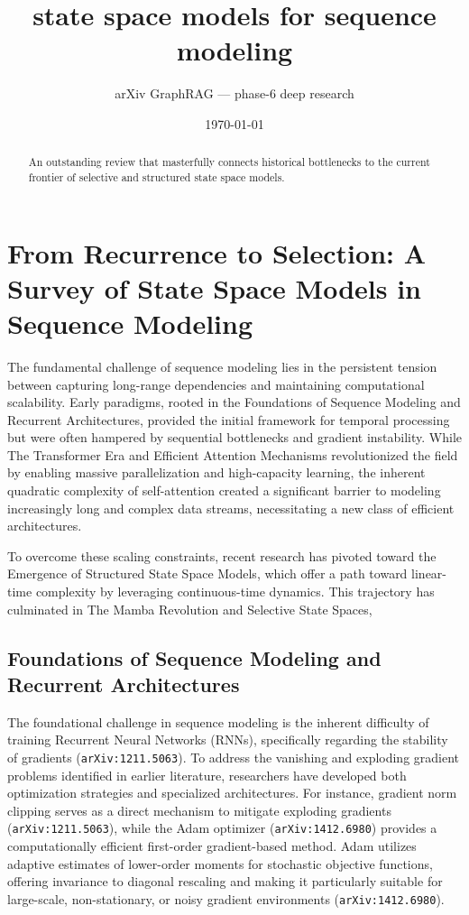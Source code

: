 \documentclass[11pt]{article}
\title{state space models for sequence modeling}
\author{arXiv GraphRAG --- phase-6 deep research}
\date{\today}
\begin{document}
\maketitle

\begin{abstract}
An outstanding review that masterfully connects historical bottlenecks to the current frontier of selective and structured state space models.
\end{abstract}

\section{From Recurrence to Selection: A Survey of State Space Models in Sequence Modeling}

The fundamental challenge of sequence modeling lies in the persistent tension between capturing long-range dependencies and maintaining computational scalability. Early paradigms, rooted in the Foundations of Sequence Modeling and Recurrent Architectures, provided the initial framework for temporal processing but were often hampered by sequential bottlenecks and gradient instability. While The Transformer Era and Efficient Attention Mechanisms revolutionized the field by enabling massive parallelization and high-capacity learning, the inherent quadratic complexity of self-attention created a significant barrier to modeling increasingly long and complex data streams, necessitating a new class of efficient architectures.

To overcome these scaling constraints, recent research has pivoted toward the Emergence of Structured State Space Models, which offer a path toward linear-time complexity by leveraging continuous-time dynamics. This trajectory has culminated in The Mamba Revolution and Selective State Spaces,

\subsection{Foundations of Sequence Modeling and Recurrent Architectures}

The foundational challenge in sequence modeling is the inherent difficulty of training Recurrent Neural Networks (RNNs), specifically regarding the stability of gradients (\texttt{arXiv:1211.5063}). To address the vanishing and exploding gradient problems identified in earlier literature, researchers have developed both optimization strategies and specialized architectures. For instance, gradient norm clipping serves as a direct mechanism to mitigate exploding gradients (\texttt{arXiv:1211.5063}), while the Adam optimizer (\texttt{arXiv:1412.6980}) provides a computationally efficient first-order gradient-based method. Adam utilizes adaptive estimates of lower-order moments for stochastic objective functions, offering invariance to diagonal rescaling and making it particularly suitable for large-scale, non-stationary, or noisy gradient environments (\texttt{arXiv:1412.6980}).
\end{document}
